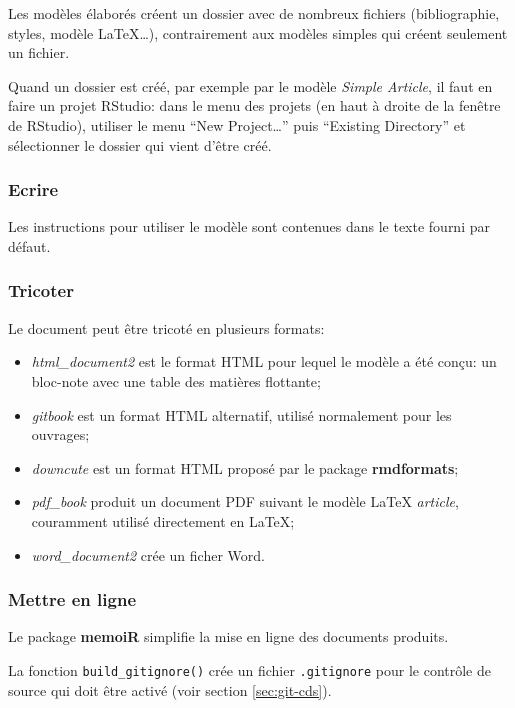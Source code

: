 \documentclass[
  12pt,
  french,
  a4paper,
  extrafontsizes,onecolumn,openright
  ]{memoir}
\providecommand{\tightlist}{%
  \setlength{\itemsep}{0pt}\setlength{\parskip}{0pt}}
\begin{document}
Les modèles élaborés créent un dossier avec de nombreux fichiers (bibliographie, styles, modèle LaTeX\ldots), contrairement aux modèles simples qui créent seulement un fichier.

Quand un dossier est créé, par exemple par le modèle \emph{Simple Article}, il faut en faire un projet RStudio: dans le menu des projets (en haut à droite de la fenêtre de RStudio), utiliser le menu \enquote{New Project\ldots{}} puis \enquote{Existing Directory} et sélectionner le dossier qui vient d'être créé.

\subsubsection{Ecrire}\label{ecrire-1}

Les instructions pour utiliser le modèle sont contenues dans le texte fourni par défaut.

\subsubsection{Tricoter}\label{tricoter}

Le document peut être tricoté en plusieurs formats:

\begin{itemize}
\tightlist
\item
  \emph{html\_document2} est le format HTML pour lequel le modèle a été conçu: un bloc-note avec une table des matières flottante;
\item
  \emph{gitbook} est un format HTML alternatif, utilisé normalement pour les ouvrages;
\item
  \emph{downcute} est un format HTML proposé par le package \textbf{rmdformats};
\item
  \emph{pdf\_book} produit un document PDF suivant le modèle LaTeX \emph{article}, couramment utilisé directement en LaTeX;
\item
  \emph{word\_document2} crée un ficher Word.
\end{itemize}

\subsubsection{Mettre en ligne}\label{sec:article-en-ligne}

Le package \textbf{memoiR} simplifie la mise en ligne des documents produits.

La fonction \texttt{build\_gitignore()} crée un fichier \texttt{.gitignore} pour le contrôle de source qui doit être activé (voir section \ref{sec:git-cds}).
\end{document}
